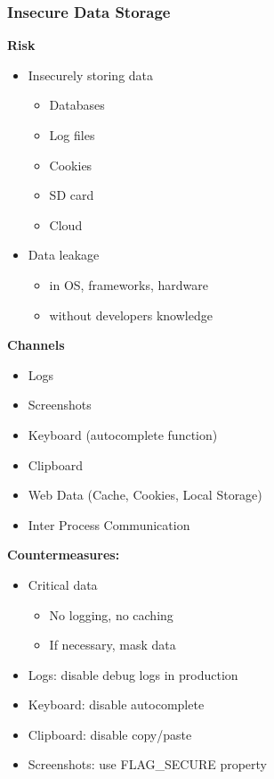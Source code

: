 \subsubsection{Insecure Data Storage}
\textbf{Risk}
\begin{itemize}
    \item Insecurely storing data
    \begin{itemize}
        \item Databases
        \item Log files
        \item Cookies
        \item SD card
        \item Cloud
    \end{itemize}
    \item Data leakage
    \begin{itemize}
        \item in OS, frameworks, hardware
        \item without developers knowledge
    \end{itemize}
\end{itemize}
\textbf{Channels}
\begin{itemize}
    \item Logs
    \item Screenshots
    \item Keyboard (autocomplete function)
    \item Clipboard
    \item Web Data (Cache, Cookies, Local Storage)
    \item Inter Process Communication
\end{itemize}
\textbf{Countermeasures:}
\begin{itemize}
    \item Critical data
    \begin{itemize}
        \item No logging, no caching
        \item If necessary, mask data
    \end{itemize}
    \item Logs: disable debug logs in production
    \item Keyboard: disable autocomplete
    \item Clipboard: disable copy/paste
    \item Screenshots: use FLAG\_SECURE property
\end{itemize}

